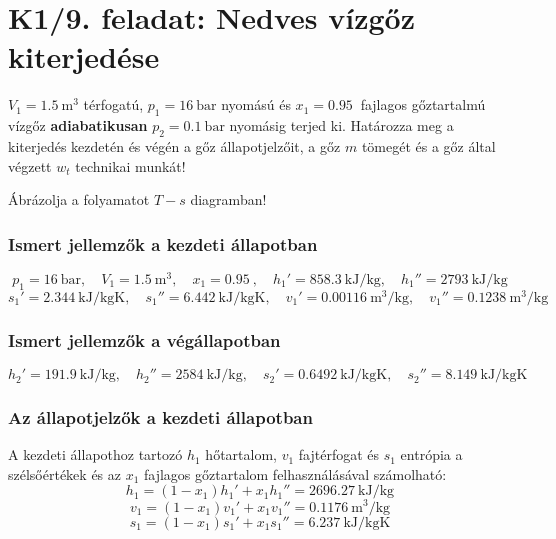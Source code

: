 


\section*{K1/9. feladat: Nedves vízgőz kiterjedése}
$V_1 = \SI{1,5}{\meter\cubed}$ térfogatú, $p_1 = \SI{16}{\bar}$ nyomású és $x_1 = \SI{0,95}{}$ fajlagos gőztartalmú vízgőz \textbf{adiabatikusan} $p_2 = \SI{0,1}{\bar}$ nyomásig terjed ki. Határozza meg a kiterjedés kezdetén és végén a gőz állapotjelzőit, a gőz $m$ tömegét és a gőz által végzett $w_t$ technikai munkát! 

\vspace{2mm}
\noindent Ábrázolja a folyamatot $T-s$ diagramban!

\subsubsection{Ismert jellemzők a kezdeti állapotban}
\begin{equation*}
	p_1 = \SI{16}{\bar}, 
	\quad 
	V_1 = \SI{1,5}{\meter\cubed}, 
	\quad
	x_1 = \SI{0,95}{},
	\quad
	h_1' = \SI{858,3}{\kilo\joule\per\kilogram},
	\quad
	h_1'' = \SI{2793}{\kilo\joule\per\kilogram}
\end{equation*}
\begin{equation*}
	s_1' = \SI{2,344}{\kilo\joule\per\kilogram\kelvin},
	\quad
	s_1'' = \SI{6,442}{\kilo\joule\per\kilogram\kelvin},
	\quad
	v_1' = \SI{0,00116}{\meter\cubed\per\kilogram},
	\quad
	v_1'' = \SI{0,1238}{\meter\cubed\per\kilogram}
\end{equation*}

\subsubsection{Ismert jellemzők a végállapotban}
\begin{equation*}
	h_2' = \SI{191,9}{\kilo\joule\per\kilogram},
	\quad
	h_2'' = \SI{2584}{\kilo\joule\per\kilogram},
	\quad
	s_2' = \SI{0,6492}{\kilo\joule\per\kilogram\kelvin},
	\quad
	s_2'' = \SI{8,149}{\kilo\joule\per\kilogram\kelvin}
\end{equation*}

\noindent\hrulefill

\subsubsection{Az állapotjelzők a kezdeti állapotban}
A kezdeti állapothoz tartozó $h_1$ hőtartalom, $v_1$ fajtérfogat és $s_1$ entrópia a szélsőértékek és az $x_1$ fajlagos gőztartalom felhasználásával számolható:
\begin{equation}
	h_1 = \left(1 - x_1\right) h_1' + x_1 h_1'' 
	= 
	\SI{2696,27}{\kilo\joule\per\kilogram}
\end{equation}
\begin{equation}
	v_1 = \left(1 - x_1\right) v_1' + x_1 v_1'' 
	= 
	\SI{0,1176}{\meter\cubed\per\kilogram}
\end{equation}
\begin{equation}
	s_1 = \left(1 - x_1\right) s_1' + x_1 s_1'' 
	= 
	\SI{6,237}{\kilo\joule\per\kilogram\kelvin}
\end{equation}

